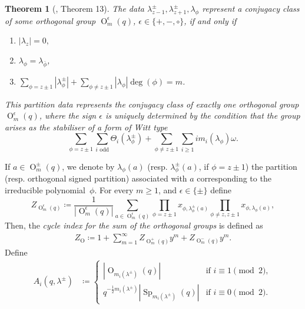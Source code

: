 \documentclass[a4paper, 12pt, oneside]{amsart}
\newtheorem{thm}[prop]{Theorem}
\theoremstyle{definition}
\DeclareMathOperator{\Sp}{Sp}
\DeclareMathOperator{\Or}{O}
\begin{document}
\begin{thm}[\cite{Fulman_cycle_index}, Theorem 13]
\label{Wall_orthogonal}
The data $\lambda^{\pm}_{z-1},\lambda^{\pm}_{z+1},\lambda_{\phi}$ represent a conjugacy class of some orthogonal group $\Or^{\epsilon}_{m}(q)$, $\epsilon \in \{+,-,\circ\}$, if and only if
\begin{enumerate}[label=(\roman*)]
    \item $|\lambda_z|=0,$
    \item $\lambda_{\phi}=\lambda_{\bar{\phi}}$,
    \item $\sum_{\phi=z\pm1}|\lambda_{\phi}^{\pm}|+\sum_{\phi \neq z \pm1}|\lambda_{\phi}|\deg (\phi)=m$.
\end{enumerate}

This partition data represents the conjugacy class of exactly one orthogonal group $\Or^{\epsilon}_m(q)$, where the sign $\epsilon$ is uniquely determined by the condition that the group arises as the stabiliser of a form of Witt type
$$\sum_{\phi=z\pm 1}\sum_{i\text{ odd}}\Theta_i(\lambda^{\pm}_{\phi})+\sum_{\phi \neq z\pm 1}\sum_{i \ge1}i m_i(\lambda_{\phi})\omega.$$
\end{thm}
If $a \in \Or^{\pm}_{m}(q)$, we denote by $\lambda_{\phi}(a)$ (resp. $\lambda^{\pm}_{\phi}(a)$, if $\phi=z\pm 1$) the partition (resp. orthogonal signed partition) associated with $a$ corresponding to the irreducible polynomial~$\phi$.
For every $m \ge 1$, and $\epsilon \in \{\pm\}$ define
$$Z_{\Or^{\epsilon}_m(q)} \coloneqq 
\frac{1}{|\Or^{\epsilon}_{m}(q)|}\sum_{a \in \Or^{\epsilon}_{m}(q)}\prod_{\phi=z\pm1}x_{\phi,\lambda^{\pm}_{\phi}(a)}\prod_{\phi\neq z,z\pm1}x_{\phi,\lambda_{\phi}(a)},$$
Then, the \textit{cycle index for the sum of the orthogonal groups} is defined as
\begin{align*}
Z_{\Or} \coloneqq 1 + \sum_{m=1}^{\infty} Z_{\Or^{+}_m(q)} y^{m} + Z_{\Or^{-}_m(q)} y^{m}.
\end{align*}
Define
\begin{align*}
A_i(q,\lambda^{\pm})&\coloneqq
\begin{cases}
|\Or_{m_i(\lambda^{\pm})}(q)| & \text{if } i \equiv 1 \pmod 2, \\
    q^{-\frac{1}{2}m_i(\lambda^{\pm})}|\Sp_{m_i(\lambda^{\pm})}(q)| & \text{if } i\equiv 0 \pmod 2.
\end{cases}\\
\end{align*}
\end{document}
